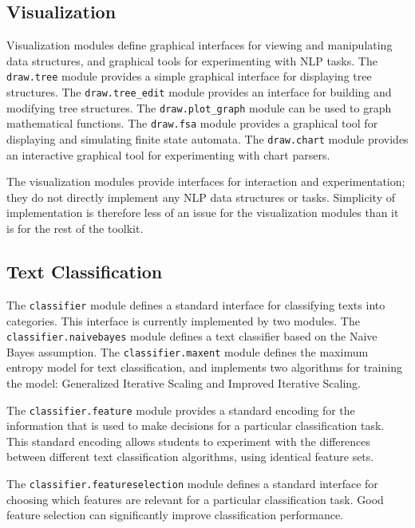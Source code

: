 \documentclass[11pt]{article}
\begin{document}
\subsection*{Visualization}

Visualization modules define graphical interfaces for viewing and
manipulating data structures, and graphical tools for experimenting
with NLP tasks.  The \texttt{draw.tree} module provides a simple
graphical interface for displaying tree structures.  The
\texttt{draw.tree\_edit} module provides an interface for building and
modifying tree structures.  The \texttt{draw.plot\_graph} module can be
used to graph mathematical functions.  The \texttt{draw.fsa} module
provides a graphical tool for displaying and simulating finite state
automata.  The \texttt{draw.chart} module provides an interactive
graphical tool for experimenting with chart parsers.

The visualization modules provide interfaces for interaction and
experimentation; they do not directly implement any NLP data
structures or tasks.  Simplicity of implementation is therefore less
of an issue for the visualization modules than it is for the rest of
the toolkit.

\subsection*{Text Classification}

The \texttt{classifier} module defines a standard interface for
classifying texts into categories.  This interface is currently
implemented by two modules.  The \texttt{classifier.naivebayes} module
defines a text classifier based on the Naive Bayes assumption. The
\texttt{classifier.maxent} module defines the maximum entropy model
for text classification, and implements two algorithms for training
the model: Generalized Iterative Scaling and Improved Iterative
Scaling.

The \texttt{classifier.feature} module provides a standard encoding
for the information that is used to make decisions for a particular
classification task.  This standard encoding allows students to
experiment with the differences between different text classification
algorithms, using identical feature sets.

The \texttt{classifier.featureselection} module defines a standard
interface for choosing which features are relevant for a particular
classification task.  Good feature selection can significantly improve
classification performance.
\end{document}
